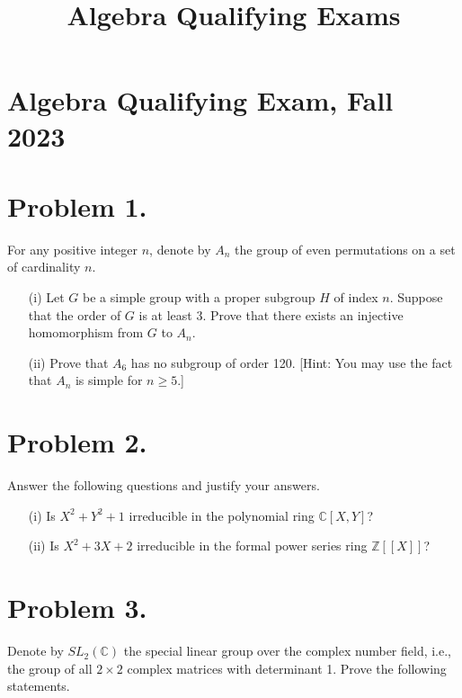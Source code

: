 \documentclass{article}
\title{Algebra Qualifying Exams}
\begin{document}
\maketitle



\section*{Algebra Qualifying Exam, Fall 2023}


\maketitle

\section*{Problem 1.}
For any positive integer \( n \), denote by \( A_n \) the group of even permutations on a set of cardinality \( n \).

\begin{enumerate}
    \item[(i)] Let \( G \) be a simple group with a proper subgroup \( H \) of index \( n \). Suppose that the order of \( G \) is at least 3. Prove that there exists an injective homomorphism from \( G \) to \( A_n \).
    
    \item[(ii)] Prove that \( A_6 \) has no subgroup of order 120. [Hint: You may use the fact that \( A_n \) is simple for \( n \geq 5 \).]
\end{enumerate}

\section*{Problem 2.}
Answer the following questions and justify your answers.

\begin{enumerate}
    \item[(i)] Is \( X^2 + Y^2 + 1 \) irreducible in the polynomial ring \( \mathbb{C}[X, Y] \)?
    
    \item[(ii)] Is \( X^2 + 3X + 2 \) irreducible in the formal power series ring \( \mathbb{Z}[[X]] \)?
\end{enumerate}

\section*{Problem 3.}
Denote by \( SL_2(\mathbb{C}) \) the special linear group over the complex number field, i.e., the group of all \( 2 \times 2 \) complex matrices with determinant 1. Prove the following statements.
\end{document}
